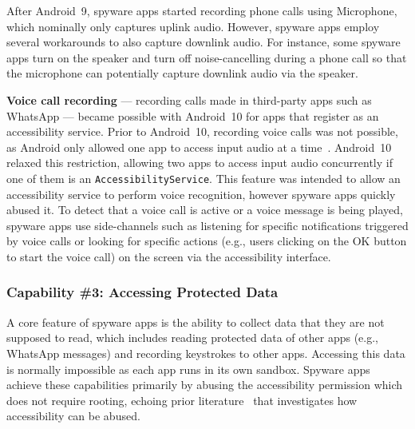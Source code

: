 After Android~9, spyware apps started recording phone calls using
Microphone, which nominally only captures uplink audio.  However, spyware apps
employ several workarounds to also capture downlink audio.  For instance, some
spyware apps turn on the speaker and turn off noise-cancelling during a phone
call so that the microphone can potentially capture downlink audio via the
speaker.


\textbf{Voice call recording} --- recording calls made in third-party apps such as WhatsApp --- became possible with
Android~10 for apps that register as an accessibility service.
Prior to Android~10,
recording voice calls was not possible, as Android only allowed one app to
access input audio at a time~\cite{Sharinga60:online}.  Android~10 relaxed this
restriction, allowing two apps to access input audio concurrently if one of them
is an \texttt{AccessibilityService}.  This feature was intended to allow an
accessibility service to perform voice recognition, however spyware apps quickly
abused it.  To detect that a voice call is active or a voice message is being
played, spyware apps use side-channels such as listening for specific
notifications triggered by voice calls or looking for specific actions (e.g.,
users clicking on the OK button to start the voice call) on the screen via
the accessibility interface.

\subsubsection*{Capability \#3: Accessing Protected Data}
A core feature of spyware apps is the ability to collect data that they
are not supposed to read, which includes reading protected data of other apps (e.g.,
WhatsApp messages) and recording keystrokes to other apps. Accessing this data is normally
impossible as each app runs in its own sandbox. Spyware apps achieve these
capabilities primarily by abusing the accessibility permission which does not
require rooting, echoing prior literature~\cite{fratantonio2017cloak,
kraunelis2013malware, jang2014a11y, diao2019kindness, kalysch2018android,
huang2021a11y, naseri2019accessileaks} that investigates how accessibility can
be abused.

